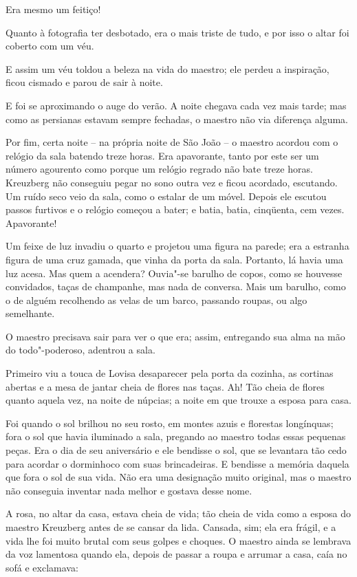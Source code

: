 Era mesmo um feitiço!

Quanto à fotografia ter desbotado, era o mais triste de tudo, e por isso
o altar foi coberto com um véu. 

E assim um véu toldou a beleza na vida do maestro; ele perdeu a
inspiração, ficou cismado e parou de sair à noite.

E foi se aproximando o auge do verão. A noite chegava cada vez mais
tarde; mas como as persianas estavam sempre fechadas, o maestro não
via diferença alguma. 

Por fim, certa noite -- na própria noite de São João -- o maestro acordou
com o relógio da sala batendo treze horas. Era apavorante, tanto por
este ser um número agourento como porque um relógio regrado não bate
treze horas. Kreuzberg não conseguiu pegar no sono outra vez e ficou
acordado, escutando. Um ruído seco veio da sala, como o estalar de um
móvel. Depois ele escutou passos furtivos e o relógio começou a bater;
e batia, batia, cinqüenta, cem vezes. Apavorante!

Um feixe de luz invadiu o quarto e projetou uma figura na parede; era a
estranha figura de uma cruz gamada, que vinha da porta da sala.
Portanto, lá havia uma luz acesa. Mas quem a acendera? Ouvia"-se 
barulho de copos, como se houvesse convidados, taças de champanhe, mas
nada de conversa. Mais um barulho, como o de alguém recolhendo as velas
de um barco, passando roupas, ou algo semelhante.

O maestro precisava sair para ver o que era; assim, entregando sua alma
na mão do todo"-poderoso, adentrou a sala.

Primeiro viu a touca de Lovisa desaparecer pela porta da cozinha, as
cortinas abertas e a mesa de jantar cheia de flores nas taças. Ah! Tão
cheia de flores quanto aquela vez, na noite de núpcias; a noite em que
trouxe a esposa para casa.

Foi quando o sol brilhou no seu rosto, em montes azuis e florestas
longínquas; fora o sol que havia iluminado a sala, pregando ao maestro
todas essas pequenas peças. Era o dia de seu aniversário e ele bendisse
o sol, que se levantara tão cedo para acordar o dorminhoco com suas
brincadeiras. E bendisse a memória daquela que fora o sol de sua
vida. Não era uma designação muito original, mas o maestro não
conseguia inventar nada melhor e gostava desse nome.

A rosa, no altar da casa, estava cheia de vida; tão cheia de vida como a
esposa do maestro Kreuzberg antes de se cansar da lida. Cansada, sim;
ela era frágil, e a vida lhe foi muito brutal com seus golpes e
choques. O maestro ainda se lembrava da voz lamentosa quando ela,
depois de passar a roupa e arrumar a casa, caía no sofá e exclamava:

